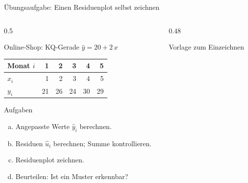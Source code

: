 \documentclass[aspectratio=169,11pt]{beamer}
\begin{document}
\begin{frame}{Übungsaufgabe: Einen Residuenplot selbst zeichnen}
  \begin{columns}[T]
    \begin{column}{0.5\textwidth}
      \small
      \begin{block}{Online-Shop: KQ-Gerade $\hat{y} = 20 + 2\,x$}
        \begin{center}
          \renewcommand{\arraystretch}{1.05}
          \begin{tabular}{l*{5}{r}}
            \toprule
            Monat $i$ & 1  & 2  & 3  & 4  & 5  \\
            \midrule
            $x_i$     & 1  & 2  & 3  & 4  & 5  \\
            $y_i$     & 21 & 26 & 24 & 30 & 29 \\
            \bottomrule
          \end{tabular}
        \end{center}
      \end{block}
      \begin{exampleblock}{Aufgaben}
        \begin{enumerate}[a)]
          \item Angepasste Werte $\hat{y}_i$ berechnen.
          \item Residuen $\hat{u}_i$ berechnen; Summe kontrollieren.
          \item Residuenplot zeichnen.
          \item Beurteilen: Ist ein Muster erkennbar?
        \end{enumerate}
      \end{exampleblock}
    \end{column}
    \begin{column}{0.48\textwidth}
      \begin{center}\footnotesize Vorlage zum Einzeichnen\end{center}
    \end{column}
  \end{columns}
\end{frame}
\end{document}
